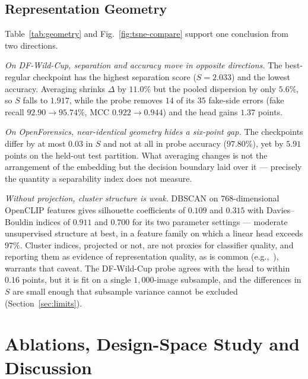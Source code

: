 \documentclass[10pt,journal]{IEEEtran}
\begin{document}
\subsection{Representation Geometry}\label{sec:cluster}
Table~\ref{tab:geometry} and Fig.~\ref{fig:tsne-compare} support one
conclusion from two directions.

\emph{On DF-Wild-Cup, separation and accuracy move in opposite directions.}
The best-regular checkpoint has the highest separation score ($S=2.033$) and
the lowest accuracy. Averaging shrinks $\Delta$ by $11.0\%$ but the pooled
dispersion by only $5.6\%$, so $S$ falls to $1.917$, while the probe removes
$14$ of its $35$ fake-side errors (fake recall $92.90\to95.74\%$, MCC
$0.922\to0.944$) and the head gains $1.37$ points.

\emph{On OpenForensics, near-identical geometry hides a six-point gap.} The
checkpoints differ by at most $0.03$ in $S$ and not at all in probe accuracy
($97.80\%$), yet by $5.91$ points on the held-out test partition. What averaging
changes is not the arrangement of the embedding but the decision boundary laid
over it --- precisely the quantity a separability index does not measure.

\emph{Without projection, cluster structure is weak.} DBSCAN on
$768$-dimensional OpenCLIP features gives silhouette coefficients of $0.109$
and $0.315$ with Davies--Bouldin indices of $0.911$ and $0.700$ for its two
parameter settings --- moderate unsupervised structure at best, in a feature
family on which a linear head exceeds $97\%$. Cluster indices, projected or not,
are not proxies for classifier quality, and reporting them as evidence of
representation quality, as is common (e.g.,~\cite{bhattacharjee2026caenet}),
warrants that caveat.
The DF-Wild-Cup probe agrees with the head to within $0.16$ points, but it is
fit on a single $1{,}000$-image subsample, and the differences in $S$ are small
enough that subsample variance cannot be excluded (Section~\ref{sec:limits}).

\section{Ablations, Design-Space Study and Discussion}\label{sec:discussion}
\end{document}
